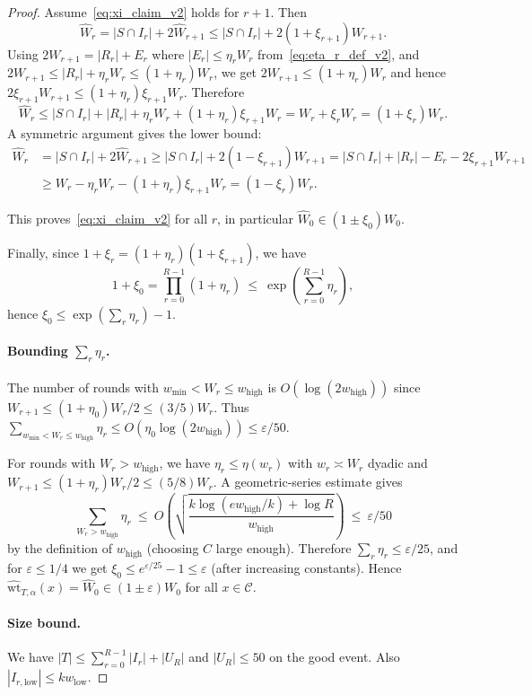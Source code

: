 \documentclass[10pt,a4paper]{amsart}
\DeclareMathOperator{\high}{\mathrm{high}}
\DeclareMathOperator{\low}{\mathrm{low}}
\newcommand{\calC}{\mathcal{C}}
\begin{document}
\begin{proof}
{Assume~\eqref{eq:xi_claim_v2} holds for $r+1$. Then
\[
\widehat W_r
=
|S\cap I_r|+2\widehat W_{r+1}
\le
|S\cap I_r|+2(1+\xi_{r+1})W_{r+1}.
\]
Using $2W_{r+1}=|R_r|+E_r$ where $|E_r|\le \eta_r W_r$ from~\eqref{eq:eta_r_def_v2}, and
$2W_{r+1}\le |R_r|+\eta_r W_r\le (1+\eta_r)W_r$, we get $2W_{r+1}\le (1+\eta_r)W_r$ and hence
$2\xi_{r+1}W_{r+1}\le (1+\eta_r)\xi_{r+1}W_r$.
Therefore
\[
\widehat W_r
\le
|S\cap I_r|+|R_r|+\eta_r W_r+(1+\eta_r)\xi_{r+1}W_r
=
W_r+\xi_r W_r
=
(1+\xi_r)W_r.
\]
A symmetric argument gives the lower bound:
\begin{align*}
\widehat W_r
&   =
|S\cap I_r|+2\widehat W_{r+1}
\ge
|S\cap I_r|+2(1-\xi_{r+1})W_{r+1}
=
|S\cap I_r|+|R_r|-E_r-2\xi_{r+1}W_{r+1}
\\
& \ge
W_r-\eta_r W_r-(1+\eta_r)\xi_{r+1}W_r
=
(1-\xi_r)W_r.
\end{align*}
    

This proves~\eqref{eq:xi_claim_v2} for all $r$, in particular
$\widehat W_0\in(1\pm \xi_0)W_0$.

Finally, since $1+\xi_r=(1+\eta_r)(1+\xi_{r+1})$, we have
\[
1+\xi_0=\prod_{r=0}^{R-1}(1+\eta_r)\ \le\ \exp\!\left(\sum_{r=0}^{R-1}\eta_r\right),
\]
hence $\xi_0\le \exp(\sum_r\eta_r)-1$.

\paragraph{Bounding $\sum_r\eta_r$.}
The number of rounds with $w_{\min}<W_r\le w_{\high}$ is $O(\log(2w_{\high}))$ since
$W_{r+1}\le (1+\eta_0)W_r/2\le (3/5)W_r$.
Thus $\sum_{w_{\min}<W_r\le w_{\high}}\eta_r\le O(\eta_0\log(2w_{\high}))\le \varepsilon/50$.

For rounds with $W_r>w_{\high}$, we have $\eta_r\le \eta(w_r)$ with $w_r\asymp W_r$ dyadic and
$W_{r+1}\le (1+\eta_r)W_r/2\le (5/8)W_r$. A geometric-series estimate gives
\[
\sum_{W_r>w_{\high}}\eta_r
\ \le\
O\!\left(\sqrt{\frac{k\log(e w_{\high}/k)+\log R}{w_{\high}}}\right)
\ \le\ \varepsilon/50
\]
by the definition of $w_{\high}$ (choosing $C$ large enough).
Therefore $\sum_r\eta_r\le \varepsilon/25$, and for $\varepsilon\le 1/4$ we get
$\xi_0\le e^{\varepsilon/25}-1\le \varepsilon$ (after increasing constants).
Hence $\widehat{\mathrm{wt}}_{T,\alpha}(x)=\widehat W_0\in (1\pm\varepsilon)W_0$ for all $x\in\calC$.}

\paragraph{Size bound.}
We have $|T|\le \sum_{r=0}^{R-1}|I_r|+|U_R|$ and $|U_R|\le 50$ on the good event.
Also $|I_{r,\mathrm{low}}|\le k w_{\low}$.


\end{proof}
\end{document}
